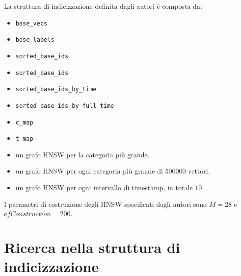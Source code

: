 La struttura di indicizzazione definita dagli autori è composta da:
\begin{itemize}
    \item \texttt{base\_vecs}
    \item \texttt{base\_labels}
    \item \texttt{sorted\_base\_ids}
    \item \texttt{sorted\_base\_ids}
    \item \texttt{sorted\_base\_ids\_by\_time} 
    \item \texttt{sorted\_base\_ids\_by\_full\_time}
    \item \texttt{c\_map}
    \item \texttt{t\_map}
    \item un grafo HNSW per la categoria più grande.
    \item un grafo HNSW per ogni categoria più grande di $500000$ vettori.
    \item un grafo HNSW per ogni intervallo di timestamp, in totale $10$.
\end{itemize}

I parametri di costruzione degli HNSW specificati dagli autori sono $M = 28$ e 
$efConstruction = 200$.


\section{Ricerca nella struttura di indicizzazione}

